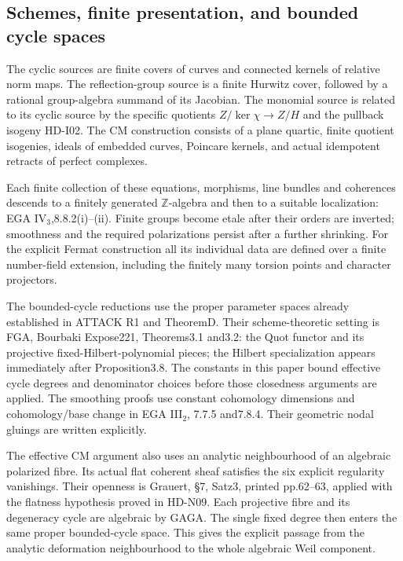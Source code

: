 \subsection{Schemes, finite presentation, and bounded cycle spaces}

The cyclic sources are finite covers of curves and connected kernels
of relative norm maps. The reflection-group source is a finite Hurwitz
cover, followed by a rational group-algebra summand of its Jacobian.
The monomial source is related to its cyclic source by the specific
quotients $Z/\ker\chi\to Z/H$ and the pullback isogeny HD-I02.
The CM construction consists of a plane quartic, finite quotient
isogenies, ideals of embedded curves, Poincare kernels, and actual
idempotent retracts of perfect complexes.

Each finite collection of these equations, morphisms, line bundles and
coherences descends to a finitely generated $\mathbb Z$-algebra and then
to a suitable localization: EGA IV$_3$,8.8.2(i)--(ii).
Finite groups become etale after their orders are inverted; smoothness
and the required polarizations persist after a further shrinking.
For the explicit Fermat construction all its individual data are
defined over a finite number-field extension, including the finitely
many torsion points and character projectors.

The bounded-cycle reductions use the proper parameter spaces already
established in ATTACK R1 and TheoremD. Their scheme-theoretic setting is
FGA, Bourbaki Expose221, Theorems3.1 and3.2: the Quot functor and its
projective fixed-Hilbert-polynomial pieces; the Hilbert specialization
appears immediately after Proposition3.8. The constants in this paper
bound effective cycle degrees and denominator choices before those
closedness arguments are applied. The smoothing proofs use constant
cohomology dimensions and cohomology/base change in EGA III$_2$,
7.7.5 and7.8.4. Their geometric nodal gluings are written explicitly.

The effective CM argument also uses an analytic neighbourhood of an
algebraic polarized fibre. Its actual flat coherent sheaf satisfies
the six explicit regularity vanishings. Their openness is Grauert,
\S7, Satz3, printed pp.62--63, applied with the flatness hypothesis
proved in HD-N09. Each projective fibre and its degeneracy cycle are
algebraic by GAGA. The single fixed degree then enters the same
proper bounded-cycle space. This gives the explicit passage from the
analytic deformation neighbourhood to the whole algebraic Weil
component.

